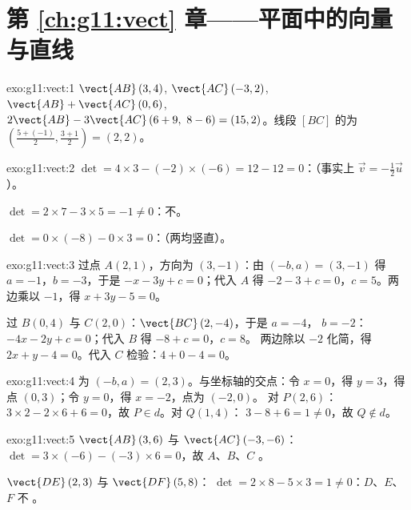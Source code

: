 \section*{第 \ref{ch:g11:vect} 章——平面中的向量与直线}

\begin{solution}{exo:g11:vect:1}
$\vect{AB}\,(3, 4)$, $\vect{AC}\,(-3, 2)$,
$\vect{AB} + \vect{AC}\,(0, 6)$,
$2\vect{AB} - 3\vect{AC}\,(6 + 9,\ 8 - 6) = (15, 2)$。线段
$[BC]$ 的为 $\left(\frac{5 + (-1)}{2}, \frac{3+1}{2}\right) = (2, 2)$。
\end{solution}

\begin{solution}{exo:g11:vect:2}
$\det = 4 \times 3 - (-2) \times (-6) = 12 - 12 = 0$：（事实上
$\vec v = -\frac12 \vec u$）。

$\det = 2 \times 7 - 3 \times 5 = -1 \neq 0$：不。

$\det = 0 \times (-8) - 0 \times 3 = 0$：（两均竖直）。
\end{solution}

\begin{solution}{exo:g11:vect:3}
过点 $A(2,1)$，方向为 $(3, -1)$：由 $(-b, a) = (3, -1)$ 得
$a = -1$，$b = -3$，于是 $-x - 3y + c = 0$；代入 $A$ 得 $-2 - 3 + c =
0$，$c = 5$。两边乘以 $-1$，得 $x + 3y - 5 = 0$。

过 $B(0,4)$ 与 $C(2,0)$：$\vect{BC}\,(2, -4)$，于是 $a = -4$，
$b = -2$：$-4x - 2y + c = 0$；代入 $B$ 得 $-8 + c = 0$，$c = 8$。
两边除以 $-2$ 化简，得 $2x + y - 4 = 0$。代入 $C$ 检验：$4 + 0 - 4 = 0$。
\end{solution}

\begin{solution}{exo:g11:vect:4}
为 $(-b, a) = (2, 3)$。与坐标轴的交点：令 $x = 0$，得
$y = 3$，得点 $(0, 3)$；令 $y = 0$，得 $x = -2$，点为 $(-2, 0)$。
对 $P(2,6)$：$3 \times 2 - 2 \times 6 + 6 = 0$，故 $P \in d$。对 $Q(1,4)$：
$3 - 8 + 6 = 1 \neq 0$，故 $Q \notin d$。
\end{solution}

\begin{solution}{exo:g11:vect:5}
$\vect{AB}\,(3, 6)$ 与 $\vect{AC}\,(-3, -6)$：
$\det = 3 \times (-6) - (-3) \times 6 = 0$，故 $A$、$B$、$C$ 。

$\vect{DE}\,(2, 3)$ 与 $\vect{DF}\,(5, 8)$：
$\det = 2 \times 8 - 5 \times 3 = 1 \neq 0$：$D$、$E$、$F$ 不
。
\end{solution}


